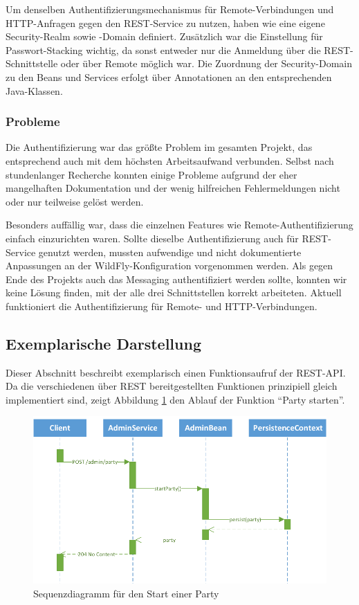 Um denselben Authentifizierungsmechanismus für Remote-Verbindungen und HTTP-Anfragen gegen den REST-Service zu nutzen, haben wie eine eigene Security-Realm sowie -Domain definiert. Zusätzlich war die Einstellung für Passwort-Stacking wichtig, da sonst entweder nur die Anmeldung über die REST-Schnittstelle oder über Remote möglich war. Die Zuordnung der Security-Domain zu den Beans und Services erfolgt über Annotationen an den entsprechenden Java-Klassen. 

\subsubsection{Probleme}
Die Authentifizierung war das größte Problem im gesamten Projekt, das entsprechend auch mit dem höchsten Arbeitsaufwand verbunden. Selbst nach stundenlanger Recherche konnten einige Probleme aufgrund der eher mangelhaften Dokumentation und der wenig hilfreichen Fehlermeldungen nicht oder nur teilweise gelöst werden.

Besonders auffällig war, dass die einzelnen Features wie Remote-Authentifizierung einfach einzurichten waren. Sollte dieselbe Authentifizierung auch für REST-Service genutzt werden, mussten aufwendige und nicht dokumentierte Anpassungen an der WildFly-Konfiguration vorgenommen werden. Als gegen Ende des Projekts auch das Messaging authentifiziert werden sollte, konnten wir keine Lösung finden, mit der alle drei Schnittstellen korrekt arbeiteten. Aktuell funktioniert die Authentifizierung für Remote- und HTTP-Verbindungen. 


\subsection{Exemplarische Darstellung}
Dieser Abschnitt beschreibt exemplarisch einen Funktionsaufruf der REST-API. Da die verschiedenen über REST bereitgestellten Funktionen prinzipiell gleich implementiert sind, zeigt Abbildung \ref{fig:AufrufSequenz} den Ablauf der Funktion "`Party starten"'.

\begin{figure}[tbh]
\centering
\includegraphics[width=1.0\linewidth]{Bilder/AufrufSequenz}
\caption{Sequenzdiagramm für den Start einer Party}
\label{fig:AufrufSequenz}
\end{figure}

